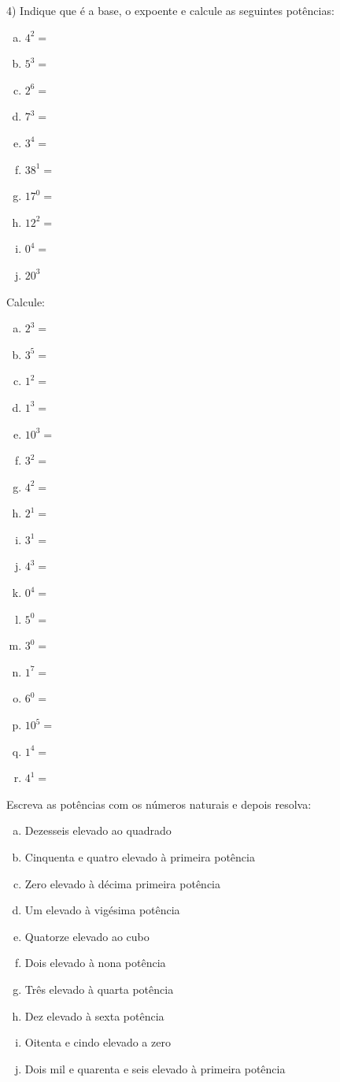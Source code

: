 4) Indique que é a base, o expoente e calcule as seguintes potências:
\begin{multicols}{5}
\begin{enumerate}[a)]
	\item $4^2=$
	\item $5^ 3=$
	\item $2^6=$
	\item $7^3=$
	\item $3^4=$
	\item $38^1=$
	\item $17^0=$
	\item $12^2=$
	\item $0^4=$
	\item $20^3$
\end{enumerate}
\end{multicols}

\item Calcule:
\begin{multicols}{6}
\begin{enumerate}[a)]
	\item $2^3 =$
	\item $3^5 =$
	\item $1^2 =$
	\item $1^3 =$
	\item $10^3 =$
	\item $3^2 =$
	\item $4^2 =$
	\item $2^1 =$
	\item $3^1 =$
	\item $4^3 =$
	\item $0^4 =$
	\item $5^0 =$
	\item $3^0 =$
	\item $1^7 =$
	\item $6^0 =$
	\item $10^5 =$
	\item $1^4 =$
	\item $4^1 =$
\end{enumerate}
\end{multicols}

\item Escreva as potências com os números naturais e depois resolva:
\begin{enumerate}[a)]	
	\item Dezesseis elevado ao quadrado
	\item Cinquenta e quatro elevado à primeira potência	
	\item Zero elevado à décima primeira potência
	\item Um elevado à vigésima potência
	\item Quatorze elevado ao cubo
	\item Dois elevado à nona potência
	\item Três elevado à quarta potência
	\item Dez elevado à sexta potência
	\item Oitenta e cindo elevado a zero
	\item Dois mil e quarenta e seis elevado à primeira potência
\end{enumerate}

